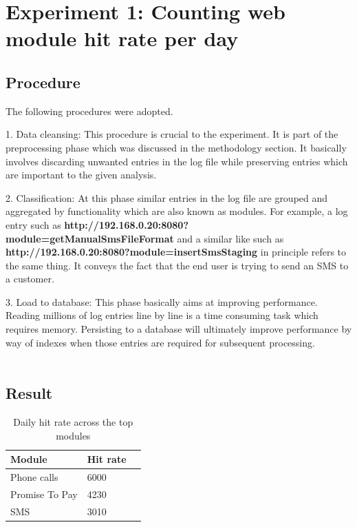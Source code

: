 \documentclass[12pt, letterpaper, titlepage]{report}
\begin{document}
\section{Experiment 1: Counting web module hit rate per day}
\subsection{Procedure}
The following procedures were adopted.

1. Data cleansing: This procedure is crucial to the experiment. It is part of the preprocessing phase which was discussed in the methodology section. It basically involves discarding unwanted entries in the log file while preserving entries which are important to the given analysis.

2. Classification: At this phase similar entries in the log file are grouped and aggregated by functionality which are also known as modules. For example, a log entry such as \textbf{http://192.168.0.20:8080?module=getManualSmsFileFormat} and a similar like such as \textbf{http://192.168.0.20:8080?module=insertSmsStaging} in principle refers to the same thing. It conveys the fact that the end user is trying to send an SMS to a customer.

3. Load to database: This phase basically aims at improving performance. Reading millions of log entries line by line is a time consuming task which requires memory. Persisting to a database will ultimately improve performance by way of indexes when those entries are required for subsequent processing.\\\\

\subsection{Result} 

\begin{table}[h!]
	\centering
	
	
	\begin{tabular}{|l|l|l|}
		\hline
		\textbf{Module} & \textbf{Hit rate} \\ \hline
		Phone calls        & 6000                        \\ \hline
		Promise To Pay        & 4230                        \\ \hline
		SMS        & 3010                        \\ \hline
	\end{tabular}
	\caption{Daily hit rate across the top modules}
	\label{hit rate}
\end{table}
\end{document}
